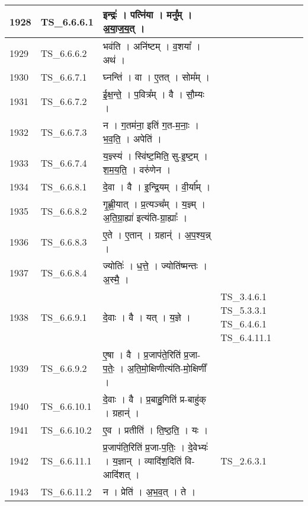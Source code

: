 \documentclass[17pt]{extarticle}
\begin{document}
\begin{longtable}{||p{0.4in}||p{0.9in}||p{4.0in}||p{0.9in}||}
        \hline
            1928 & TS\_6.6.6.1 & इन्द्रः॑   ।   पत्नि॑या   ।   मनु᳚म्   ।   अ॒या॒ज॒य॒त्   ।    &      \\
        \hline
            1929 & TS\_6.6.6.2 & भव॑ति   ।   अनि॑ष्टम्   ।   व॒शया᳚   ।   अथ॑   ।    &      \\
        \hline
            1930 & TS\_6.6.7.1 & घ्नन्ति॑   ।   वा   ।   ए॒तत्   ।   सोम᳚म्   ।    &      \\
        \hline
            1931 & TS\_6.6.7.2 & ई॒क्ष॒न्ते॒   ।   प॒वित्र᳚म्   ।   वै   ।   सौ॒म्यः   ।    &      \\
        \hline
            1932 & TS\_6.6.7.3 & न   ।   ग॒तम॑ना॒ इति॑ ग॒त{-}म॒नाः॒   ।   भ॒व॒ति॒   ।   अपेति॑   ।    &      \\
        \hline
            1933 & TS\_6.6.7.4 & य॒ज्ञ्स्य॑   ।   स्वि॑ष्ट॒मिति॒ सु{-}इ॒ष्ट॒म्   ।   श॒म॒य॒ति॒   ।   वरु॑णेन   ।    &      \\
        \hline
            1934 & TS\_6.6.8.1 & दे॒वा   ।   वै   ।   इ॒न्द्रि॒यम्   ।   वी॒र्या᳚म्   ।    &      \\
        \hline
            1935 & TS\_6.6.8.2 & गृ॒ह्णी॒यात्   ।   प्र॒त्यञ्च᳚म्   ।   य॒ज्ञ्म्   ।   अ॒ति॒ग्रा॒ह्या॑ इत्य॑ति{-}ग्रा॒ह्याः᳚   ।    &      \\
        \hline
            1936 & TS\_6.6.8.3 & ए॒ते   ।   ए॒तान्   ।   ग्रहान्॑   ।   अ॒प॒श्य॒न्न्   ।    &      \\
        \hline
            1937 & TS\_6.6.8.4 & ज्योतिः॑   ।   ध॒त्ते॒   ।   ज्योति॑ष्मन्तः   ।   अ॒स्मै॒   ।    &      \\
        \hline
            1938 & TS\_6.6.9.1 & दे॒वाः   ।   वै   ।   यत्   ।   य॒ज्ञे   ।    & TS\_3.4.6.1 TS\_5.3.3.1 TS\_6.4.6.1 TS\_6.4.11.1        \\
        \hline
            1939 & TS\_6.6.9.2 & ए॒षा   ।   वै   ।   प्र॒जाप॑ते॒रिति॑ प्र॒जा{-}प॒तेः॒   ।   अ॒ति॒मो॒क्षिणीत्य॑ति{-}मो॒क्षिणी᳚   ।    &      \\
        \hline
            1940 & TS\_6.6.10.1 & दे॒वाः   ।   वै   ।   प्र॒बाहु॒गिति॑ प्र{-}बाहु॑क्   ।   ग्रहान्॑   ।    &      \\
        \hline
            1941 & TS\_6.6.10.2 & ए॒व   ।   प्रतीति॑   ।   ति॒ष्ठ॒ति॒   ।   यः   ।    &      \\
        \hline
            1942 & TS\_6.6.11.1 & प्र॒जाप॑ति॒रिति॑ प्र॒जा{-}प॒तिः॒   ।   दे॒वेभ्यः॑   ।   य॒ज्ञान्   ।   व्यादि॑श॒दिति॑ वि{-}आदि॑शत्   ।    & TS\_2.6.3.1        \\
        \hline
            1943 & TS\_6.6.11.2 & न   ।   प्रेति॑   ।   अ॒भ॒व॒त्   ।   ते   ।    &      \\

\end{longtable}
\end{document}
